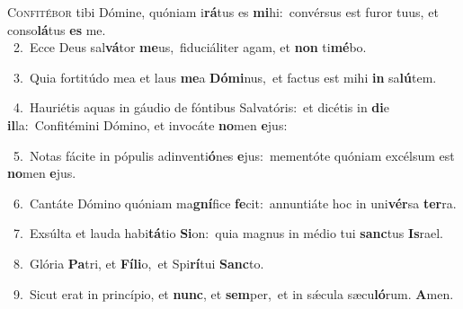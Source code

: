 \lettrine{\initial\textcolor{\initialcolor}{C}}{onfitébor} tibi Dómine, quóniam i\-\textbf{rá}\-tus es \textbf{mi}\-hi:~\star convérsus est furor tuus, et conso\-\textbf{lá}\-tus \textbf{es} me.\\
{\numbfont\textcolor{\numbcolor}{~2.}}~Ecce Deus sal\-\textbf{vá}\-tor \textbf{me}\-us,~\star fiduciáliter agam, et \textbf{non} ti\-\textbf{mé}\-bo.\par
{\numbfont\textcolor{\numbcolor}{~3.}}~Quia fortitúdo mea et laus \textbf{me}\-a \textbf{Dó}\-\textbf{mi}nus,~\star et factus est mihi \textbf{in} sa\-\textbf{lú}\-tem.\par
{\numbfont\textcolor{\numbcolor}{~4.}}~Hauriétis aquas in gáudio de fóntibus Salvatóris:~\dagger et dicétis in \textbf{di}\-e \textbf{il}\-la:~\star Confitémini Dómino, et invocáte \textbf{no}\-men \textbf{e}\-jus:\par
{\numbfont\textcolor{\numbcolor}{~5.}}~Notas fácite in pópulis adinventi\-\textbf{ó}\-nes \textbf{e}\-jus:~\star mementóte quóniam excélsum est \textbf{no}\-men \textbf{e}\-jus.\par
{\numbfont\textcolor{\numbcolor}{~6.}}~Cantáte Dómino quóniam ma\-\textbf{gní}\-fice \textbf{fe}\-cit:~\star annuntiáte hoc in uni\-\textbf{vér}\-sa \textbf{ter}\-ra.\par
{\numbfont\textcolor{\numbcolor}{~7.}}~Exsúlta et lauda habi\-\textbf{tá}\-tio \textbf{Si}\-on:~\star quia magnus in médio tui \textbf{sanc}\-tus \textbf{Is}\-rael.\par
{\numbfont\textcolor{\numbcolor}{~8.}}~Glória \textbf{Pa}\-tri, et \textbf{Fí}\-\textbf{li}o,~\star et Spi\-\textbf{rí}\-tui \textbf{Sanc}\-to.\par
{\numbfont\textcolor{\numbcolor}{~9.}}~Sicut erat in princípio, et \textbf{nunc}\-, et \textbf{sem}\-per,~\star et in sǽcula sæcu\-\textbf{ló}\-rum. \textbf{A}\-men.\par
